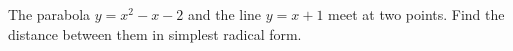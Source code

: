 The parabola $y=x^2-x-2$ and the line $y=x+1$ meet at two points. Find the distance between them in simplest radical form.
